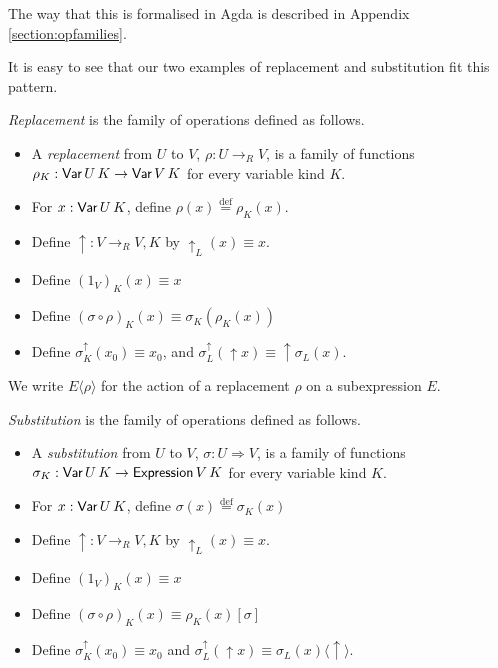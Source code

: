 \documentclass[envcountsame]{llncs}
\newcommand{\eqdef}{\ensuremath{\stackrel{\mathrm{def}}{=}}}
\begin{document}
The way that this is formalised in Agda is described in Appendix \ref{section:opfamilies}.

It is easy to see that our two examples of replacement and substitution fit this pattern.

\begin{definition}[Replacement]
 \emph{Replacement} is the family of operations defined as follows.
 \begin{itemize}
  \item A \emph{replacement} from $U$ to $V$, $\rho : U \rightarrow_R V$, is a family of functions $\rho_K : \AgdaDatatype{Var} \, U \, K \rightarrow
  \AgdaDatatype{Var} \, V \, K$ for every variable kind $K$.
  \item For $x : \AgdaDatatype{Var} \, U \, K$, define $\rho(x) \eqdef \rho_K(x)$.
  \item Define $\uparrow : V \rightarrow_R V , K$ by $\uparrow_L(x) \equiv x$.
  \item Define $(1_V)_K(x) \equiv x$
  \item Define $(\sigma \circ \rho)_K (x) \equiv \sigma_K (\rho_K(x))$
  \item Define $\sigma^\uparrow_K(x_0) \equiv x_0$, and $\sigma^\uparrow_L(\uparrow x) \equiv \uparrow \sigma_L(x)$.
\end{itemize}
\end{definition}


We write $E \langle \rho \rangle$ for the action of a replacement $\rho$ on a subexpression $E$.

\begin{definition}[Substitution]
 \emph{Substitution} is the family of operations defined as follows.
 \begin{itemize}
  \item A \emph{substitution} from $U$ to $V$, $\sigma : U \Rightarrow V$, is a family of functions $\sigma_K : \AgdaDatatype{Var} \, U \, K \rightarrow
  \AgdaDatatype{Expression} \, V \, K$ for every variable kind $K$.
  \item For $x : \AgdaDatatype{Var} \, U \, K$, define $\sigma(x) \eqdef \sigma_K(x)$
  \item Define $\uparrow : V \rightarrow_R V , K$ by $\uparrow_L(x) \equiv x$.
  \item Define $(1_V)_K(x) \equiv x$
  \item Define $(\sigma \circ \rho)_K(x) \equiv \rho_K(x) [ \sigma ]$
  \item Define $\sigma^\uparrow_K(x_0) \equiv x_0$ and $\sigma^\uparrow_L(\uparrow x) \equiv \sigma_L(x) \langle \uparrow \rangle$.
 \end{itemize}
\end{definition}
\end{document}
